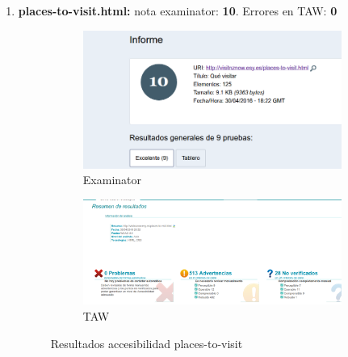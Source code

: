 \begin{enumerate}
	
	\item \textbf{places-to-visit.html: }nota examinator: \textbf{10}. Errores en TAW: \textbf{0} 
	\begin{figure}
		\centering
		\begin{subfigure}{.5\textwidth}
			\centering
			\includegraphics[width=.8\linewidth]{./Fotos/exa-visit.png}
			\caption{Examinator}
			\label{fig: Examinator places-to-visit}
		\end{subfigure}%
		\begin{subfigure}{.5\textwidth}
			\centering
			\includegraphics[width=.8\linewidth]{./Fotos/taw-visit.png}
			\caption{TAW}
			\label{fig: TAW places-to-visit}
		\end{subfigure}
		\caption{Resultados accesibilidad places-to-visit}
		\label{fig: Resultados accesibilidad places-to-visit}
	\end{figure}
	

\end{enumerate}
